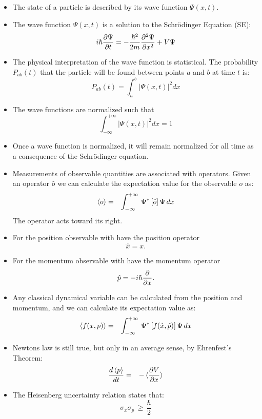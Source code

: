 \documentclass[12pt]{book}
\begin{document}
\begin{itemize}
\item The state of a particle is described by its wave function $\Psi(x,t)$.
\item The wave function $\Psi(x,t)$ is a solution to the Schr\"odinger Equation (SE):
\begin{equation}
\label{eqn:se}
i \hbar  \frac{\partial \Psi}{\partial t}  = - \frac{\hbar^2}{2 m} \frac{\partial^2 \Psi}{\partial x^2}  + V \Psi
\end{equation}
\item The physical interpretation of the wave function is statistical.  The probability $P_{ab}(t)$ that the particle will be found between points $a$ and $b$ at time $t$ is:
\begin{equation}
\label{eqn:prob}
P_{ab}(t) = \int_a^b |\Psi(x,t)|^2 dx
\end{equation}
\item The wave functions are normalized such that
\begin{equation}
\int_{-\infty}^{+\infty} |\Psi(x,t)|^2 dx = 1
\end{equation}
\item Once a wave function is normalized, it will remain normalized for all time as a consequence of the Schr\"odinger equation.
\item Measurements of observable quantities are associated with operators.  Given an operator $\hat{o}$ we can calculate the expectation value for the observable $o$ as:
\begin{eqnarray}
\braket{o}  &=& \int_{-\infty}^{+\infty} \, \Psi^* \left[ \hat{o} \right] \Psi \,dx 
\end{eqnarray}
The operator acts toward its right.
\item For the position observable with have the position operator 
\begin{equation}
\hat{x} = x.
\end{equation}
\item For the momentum observable with have the momentum operator 
\begin{equation}
\hat{p} = - i \hbar \frac{\partial}{\partial x}.
\end{equation}
\item Any classical dynamical variable can be calculated from the position and momentum, and we can calculate its expectation value as:
\begin{eqnarray}
\braket{f(x,p)}  &=& \int_{-\infty}^{+\infty} \, \Psi^* \left[ f(\hat{x},\hat{p}) \right] \Psi \,dx 
\end{eqnarray}

\item Newtons law is still true, but only in an average sense, by Ehrenfest's Theorem:
\begin{eqnarray}
\frac{d \braket{p}}{dt} &=& - \braket{\frac{\partial V}{\partial x}}
\end{eqnarray}
\item The Heisenberg uncertainty relation states that:
\begin{equation}
\sigma_x \sigma_p \, \geq \, \frac{\hbar}{2}
\end{equation}

\end{itemize}
\end{document}

